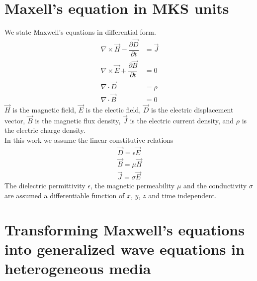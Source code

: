 \documentclass[12pt,twoside]{report}
\begin{document}
\section{Maxell's equation in MKS units}
We state Maxwell's equations in differential form.
\begin{subequations}

	\begin{align}
        \nabla \times \overrightarrow{H}-\dfrac{\partial \overrightarrow{D}}{\partial t} &= \overrightarrow{J}  \label{eqns:CurlH_Maxwell}	\\	
        \nabla \times \overrightarrow{E} + \dfrac{\partial \overrightarrow{B}}{\partial t}&= 0  \label{eqns:CurlE_Maxwell} \\
		\nabla \cdot \overrightarrow{D} &=  \rho	 \label{eqns:DivD_Maxwell}\\		
		\nabla \cdot \overrightarrow{B} &= 0	
	\end{align}
\end{subequations}
$\overrightarrow{H}$ is the magnetic field, $\overrightarrow{E}$ is the electic field, $\overrightarrow{D}$ is the electric displacement vector, $\overrightarrow{B}$ is the magnetic flux density, $\overrightarrow{J}$ is the electric current density, and $\rho$ is the electric charge density.\\
In this work we assume the linear constitutive relations 
\begin{subequations}
\begin{align}
        \overrightarrow{D} = \epsilon \overrightarrow{E} \label{eqns:constitutiveDepsE}\\
        \overrightarrow{B} = \mu \overrightarrow{H}	\label{eqns:constitutiveBH}\\
        \overrightarrow{J} = \sigma \overrightarrow{E}
\end{align}
\end{subequations}
The dielectric permittivity $\epsilon$, the magnetic permeability $\mu$ and the conductivity $\sigma$ are assumed a differentiable function of $x$, $y$, $z$ and time independent.



\section{Transforming Maxwell's equations into generalized wave equations in heterogeneous media}
\label{sec:TransMaxwellToWave}
\end{document}
